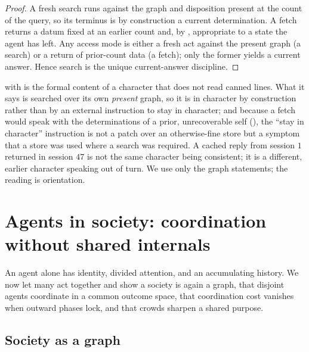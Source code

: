 \documentclass[11pt,twocolumn,a4paper]{article}
\begin{document}
\begin{proof}
A fresh search runs against the graph and disposition present at the count
of the query, so its terminus is by construction a current determination.
A fetch returns a datum fixed at an earlier count and, by
, appropriate to a state the agent has left.
Any access mode is either a fresh act against the present graph (a search)
or a return of prior-count data (a fetch); only the former yields a current
answer. Hence search is the unique current-answer discipline.
\end{proof}

\begin{remark}
\label{rem:incharacter}
 with  is the formal
content of a character that does not read canned lines. What it says is
searched over its own \emph{present} graph, so it is in character by
construction rather than by an external instruction to stay in character;
and because a fetch would speak with the determinations of a prior,
unrecoverable self (), the ``stay in
character'' instruction is not a patch over an otherwise-fine store but a
symptom that a store was used where a search was required. A cached reply
from session $1$ returned in session $47$ is not the same character being
consistent; it is a different, earlier character speaking out of turn. We
use only the graph statements; the reading is orientation.
\end{remark}

\section{Agents in society: coordination without shared internals}
\label{sec:society}

An agent alone has identity, divided attention, and an accumulating
history. We now let many act together and show a society is again a
graph, that disjoint agents coordinate in a common outcome space, that
coordination cost vanishes when outward phases lock, and that crowds
sharpen a shared purpose.

\subsection{Society as a graph}
\end{document}
